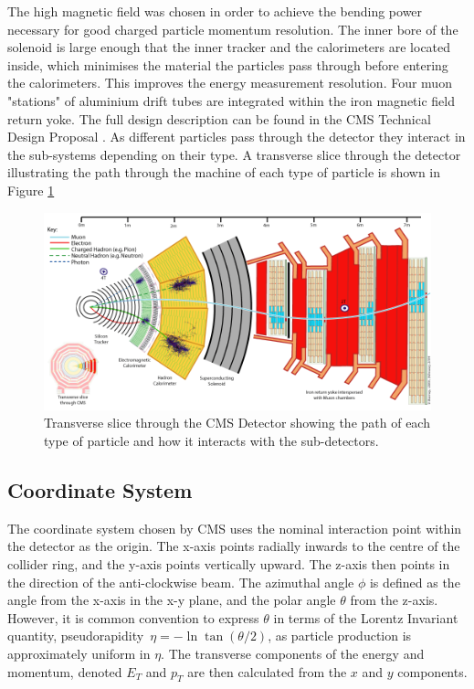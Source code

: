 The high magnetic field was chosen in order to achieve the bending power necessary for good charged particle momentum resolution. The inner bore of the solenoid is large enough that the inner tracker and the calorimeters are located inside, which minimises the material the particles pass through before entering the calorimeters. This improves the energy measurement resolution. Four muon "stations" of aluminium drift tubes are integrated within the iron magnetic field return yoke. The full design description can be found in the CMS Technical Design Proposal \cite{CMSTDP}. As different particles pass through the detector they interact in the sub-systems depending on their type. A transverse slice through the detector illustrating the path through the machine of each type of particle is shown in Figure \ref{fig:CMS_Slice} 





\begin{figure}
\centering
\includegraphics[width=1.\textwidth]{Figures/Detector/CMS_Slice}
\caption{Transverse slice through the CMS Detector showing the path of each type of particle and how it interacts with the sub-detectors.}
\label{fig:CMS_Slice}
\end{figure}
\subsection{Coordinate System}

The coordinate system chosen by CMS uses the nominal interaction point within the detector as the origin. The x-axis points radially inwards to the centre of the collider ring, and the y-axis points vertically upward. The z-axis then points in the direction of the anti-clockwise beam. The azimuthal angle $\phi$ is defined as the angle from the x-axis in the x-y plane, and the polar angle $\theta$ from the z-axis. However, it is common convention to express $\theta$ in terms of the Lorentz Invariant quantity, pseudorapidity~\begin{math}
\eta = -\ln \tan (\theta / 2) 
\end{math}, as particle production is approximately uniform in $\eta$. The transverse components of the energy and momentum, denoted $E_{T}$ and $p_{T}$ are then calculated from the $x$ and $y$ components. 



